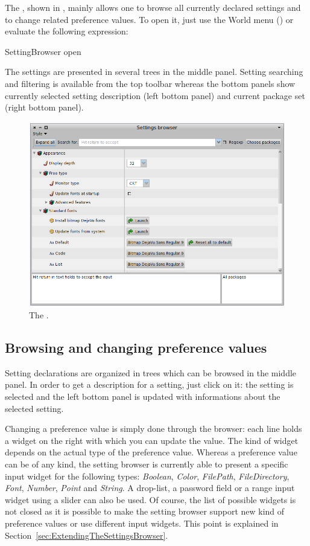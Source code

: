 \documentclass[a4paper,10pt,twoside]{book}
\begin{document}
The \setbrowser, shown in , mainly allows one to browse all currently declared settings and to change related preference values. To open it, just use the World menu () or evaluate the following expression:
\begin{code}{}
SettingBrowser open
\end{code}
The settings are presented in several trees in the middle panel. Setting searching and filtering is available from the top toolbar whereas the bottom panels show currently selected setting description (left bottom panel) and current package set (right bottom panel). 
\begin{figure}[tbh]
\begin{center}
\includegraphics[scale=0.3]{SettingBrowser}
\caption{The \setbrowser.}
\end{center}
\end{figure}

\subsection{Browsing and changing preference values}
\label{sec:browsing-settings}
Setting declarations are organized in trees which can be browsed in the middle panel. In order to get a description for a setting, just click on it: the setting is selected and the left bottom panel is updated with informations about the selected setting. 

Changing a preference value is simply done through the browser: each line holds a widget on the right with which you can update the value. The kind of widget depends on the actual type of the preference value. Whereas a preference value can be of any kind, the setting browser is currently able to present a specific input widget for the following types: \textit{Boolean}, \textit{Color}, \textit{FilePath}, \textit{FileDirectory}, \textit{Font}, \textit{Number}, \textit{Point} and \textit{String}. A drop-list, a password field or a range input widget using a slider can also be used. Of course, the list of possible widgets is not closed as it is possible to make the setting browser support new kind of preference values or use different input widgets. This point is explained in Section~\ref{sec:ExtendingTheSettingsBrowser}.
\end{document}
